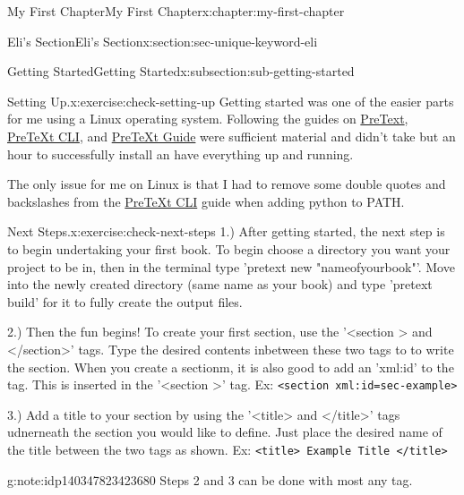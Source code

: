\documentclass[oneside,10pt,]{book}
\newcommand{\mono}[1]{\texttt{#1}}
\numberwithin{equation}{section}
\begin{document}
\begin{chapterptx}{My First Chapter}{}{My First Chapter}{}{}{x:chapter:my-first-chapter}
\begin{sectionptx}{Eli's Section}{}{Eli's Section}{}{}{x:section:sec-unique-keyword-eli}
\begin{subsectionptx}{Getting Started}{}{Getting Started}{}{}{x:subsection:sub-getting-started}
\begin{inlineexercise}{Setting Up.}{x:exercise:check-setting-up}%
Getting started was one of the easier parts for me using a Linux operating system. Following the guides on \href{https://pretextbook.org/}{PreText}, \href{https://pretextbook.github.io/pretext-cli/pretext-cli-documentation.html}{PreTeXt CLI}, and \href{https://pretextbook.org/doc/guide/html/guide-toc.html}{PreTeXt Guide} were sufficient material and didn't take but an hour to successfully install an have everything up and running.%
\par
The only issue for me on Linux is that I had to remove some double quotes and backslashes from the \href{https://pretextbook.github.io/pretext-cli/pretext-cli-documentation.html}{PreTeXt CLI} guide when adding python to PATH.%
\end{inlineexercise}
\begin{inlineexercise}{Next Steps.}{x:exercise:check-next-steps}%
1.) After getting started, the next step is to begin undertaking your first book. To begin choose a directory you want your project to be in, then in the terminal type 'pretext new "name\textunderscore{}of\textunderscore{}your\textunderscore{}book"'. Move into the newly created directory (same name as your book) and type 'pretext build' for it to fully create the output files.%
\par
2.) Then the fun begins! To create your first section, use the '\textless{}section	\textgreater{} and \textless{}\slash{}section\textgreater{}' tags. Type the desired contents inbetween these two tags to to write the section. When you create a sectionm, it is also good to add an 'xml:id' to the tag. This is inserted in the '\textless{}section	\textgreater{}' tag. Ex: \mono{<section xml:id=\textquotedbl{}sec-example\textquotedbl{}>}%
\par
3.) Add a title to your section by using the '\textless{}title\textgreater{} and \textless{}\slash{}title\textgreater{}' tags udnerneath the section you would like to define. Just place the desired name of the title between the two tags as shown. Ex: \mono{<title> Example Title </title>}%
\begin{note}{}{g:note:idp140347823423680}%
Steps 2 and 3 can be done with most any tag.\end{note}
\end{inlineexercise}
\end{subsectionptx}
%
%
\typeout{************************************************}
\typeout{************************************************}

\end{sectionptx}
\end{chapterptx}
\end{document}
